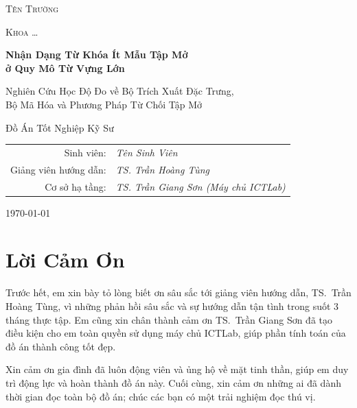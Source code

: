 \documentclass[12pt,a4paper]{report}
\begin{document}
\begin{titlepage}
\centering
\vspace*{1.5cm}
{\scshape\large Tên Trường \par}
{\scshape Khoa \dots \par}
\vfill
{\Huge\bfseries Nhận Dạng Từ Khóa Ít Mẫu Tập Mở\\[4pt]
ở Quy Mô Từ Vựng Lớn\par}
\vspace{6pt}
{\large Nghiên Cứu Học Độ Đo về Bộ Trích Xuất Đặc Trưng,\\
Bộ Mã Hóa và Phương Pháp Từ Chối Tập Mở\par}
\vfill
{\large Đồ Án Tốt Nghiệp Kỹ Sư\par}
\vspace{1cm}
\begin{tabular}{rl}
Sinh viên: & \textit{Tên Sinh Viên} \\
Giảng viên hướng dẫn: & \textit{TS. Trần Hoàng Tùng} \\
Cơ sở hạ tầng: & \textit{TS. Trần Giang Sơn (Máy chủ ICTLab)} \\
\end{tabular}
\vfill
{\large \today\par}
\end{titlepage}

\chapter*{Lời Cảm Ơn}

Trước hết, em xin bày tỏ lòng biết ơn sâu sắc tới giảng viên hướng dẫn,
TS.\ Trần Hoàng Tùng, vì những phản hồi sâu sắc và sự hướng dẫn tận tình trong
suốt 3 tháng thực tập. Em cũng xin chân thành cảm ơn TS.\ Trần Giang Sơn đã tạo
điều kiện cho em toàn quyền sử dụng máy chủ ICTLab, giúp phần tính toán của đồ
án thành công tốt đẹp.

Xin cảm ơn gia đình đã luôn động viên và ủng hộ về mặt tinh thần, giúp em duy
trì động lực và hoàn thành đồ án này. Cuối cùng, xin cảm ơn những ai đã dành
thời gian đọc toàn bộ đồ án; chúc các bạn có một trải nghiệm đọc thú vị.

\tableofcontents

\end{document}
